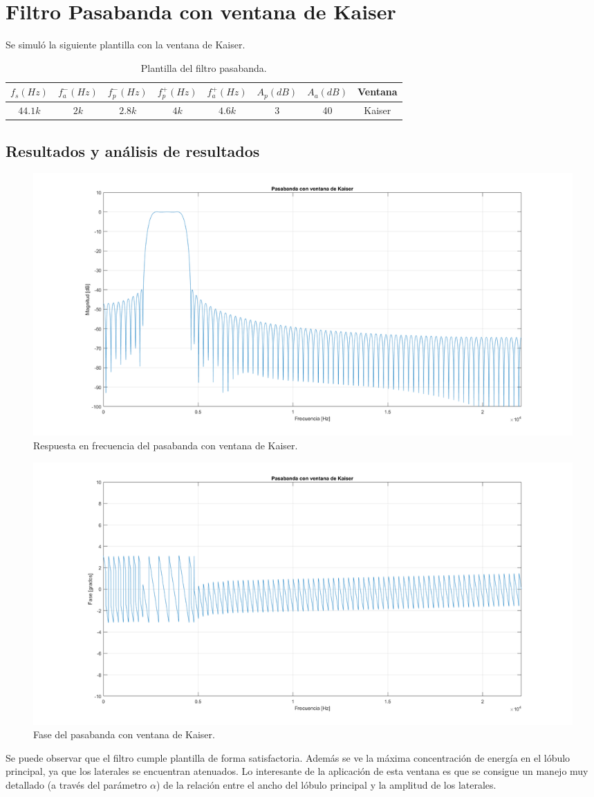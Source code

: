 \section{Filtro Pasabanda con ventana de Kaiser}
Se simuló la siguiente plantilla con la ventana de Kaiser.

\begin{table}[H]
\centering
\begin{tabular}{|c|c|c|c|c|c|c|c|}
\hline
$f_s(Hz)$ & $f_a^-(Hz)$ & $f_p^-(Hz)$ & $f_p^+(Hz)$ & $f_a^+(Hz)$ & $A_p(dB)$ & $A_a(dB)$ & Ventana     \\ \hline
$44.1k$   & $2k$        & $2.8k$      &   $4k$      &     $4.6k$ &  3         & 40        & Kaiser      \\ \hline
\end{tabular}
\caption{Plantilla del filtro pasabanda.}
\label{tab:plantillakaiser}
\end{table}


\subsection{Resultados y análisis de resultados}
\begin{figure}[H]
  \includegraphics[scale=.35]{./images/2/modulo.png}
  \caption{Respuesta en frecuencia del pasabanda con ventana de Kaiser.}
\end{figure}
\begin{figure}[H]
  \includegraphics[scale=.35]{./images/2/fase.png}
  \caption{Fase del pasabanda con ventana de Kaiser.}
\end{figure}

Se puede observar que el filtro cumple plantilla de forma satisfactoria. Además se ve la máxima concentración de energía en el lóbulo principal, ya que los laterales se encuentran atenuados. Lo interesante de la aplicación de esta ventana es que se consigue un manejo muy detallado (a través del parámetro $\alpha$) de la relación entre el ancho del lóbulo principal y la amplitud de los laterales.
